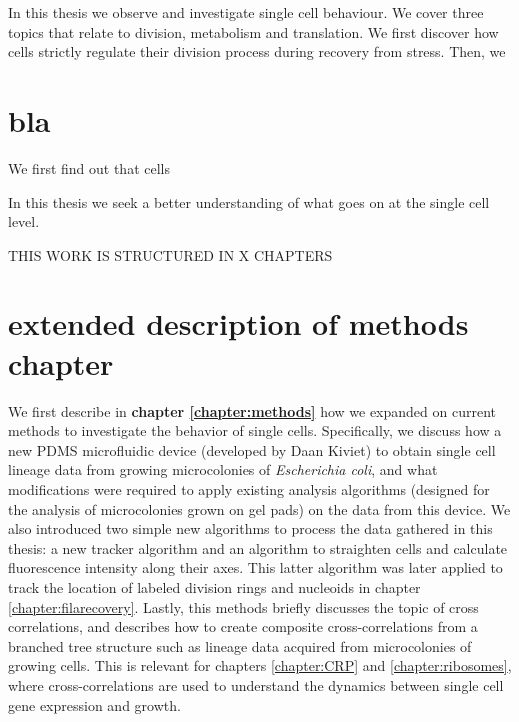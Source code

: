 


In this thesis we observe and investigate single cell behaviour.  
%
We cover three topics that relate to division, metabolism and translation.
%
We first discover how cells strictly regulate their division process during recovery from stress.
%
Then, we 

\section{bla}

We first find out that cells 



In this thesis we seek a better understanding of what goes on at the single cell level.


THIS WORK IS STRUCTURED IN X CHAPTERS


\section{extended description of methods chapter}
We first describe in \textbf{chapter \ref{chapter:methods}} how we expanded on current methods to investigate the behavior of single cells.
%
Specifically, we discuss how a new PDMS microfluidic device (developed by Daan Kiviet) to obtain single cell lineage data from growing microcolonies of \textit{Escherichia coli}, and what modifications were required to apply existing analysis algorithms (designed for the analysis of microcolonies grown on gel pads) on the data from this device.
%
We also introduced two simple new algorithms to process the data gathered in this thesis:
a new tracker algorithm and an algorithm to straighten cells and calculate fluorescence intensity along their axes. 
This latter algorithm was later applied to track the location of labeled division rings and nucleoids in chapter \ref{chapter:filarecovery}.
%
Lastly, this methods briefly discusses the topic of cross correlations,
and describes how to create composite cross-correlations from a branched tree structure such as lineage data acquired from microcolonies of growing cells.
%
This is relevant for chapters \ref{chapter:CRP} and \ref{chapter:ribosomes}, where cross-correlations are used to understand the dynamics between 
single cell gene expression and growth.




